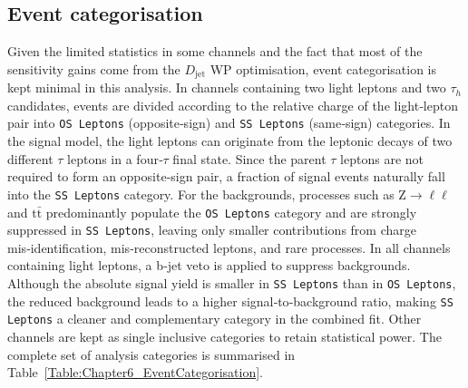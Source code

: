 \subsection{Event categorisation}
Given the limited statistics in some channels and the fact that most of the sensitivity gains come from the $D_\text{jet}$ WP optimisation, event categorisation is kept minimal in this analysis. In channels containing two light leptons and two $\tau_h$ candidates, events are divided according to the relative charge of the light‑lepton pair into \texttt{OS Leptons} (opposite‑sign) and \texttt{SS Leptons} (same‑sign) categories. In the signal model, the light leptons can originate from the leptonic decays of two different $\tau$ leptons in a four‑$\tau$ final state. Since the parent $\tau$ leptons are not required to form an opposite‑sign pair, a fraction of signal events naturally fall into the \texttt{SS Leptons} category. For the backgrounds, processes such as $\mathrm{Z\to\ell\ell}$ and $\mathrm{t\bar{t}}$ predominantly populate the \texttt{OS Leptons} category and are strongly suppressed in \texttt{SS Leptons}, leaving only smaller contributions from charge mis‑identification, mis‑reconstructed leptons, and rare processes. In all channels containing light leptons, a b‑jet veto is applied to suppress backgrounds. Although the absolute signal yield is smaller in \texttt{SS Leptons} than in \texttt{OS Leptons}, the reduced background leads to a higher signal‑to‑background ratio, making \texttt{SS Leptons} a cleaner and complementary category in the combined fit. Other channels are kept as single inclusive categories to retain statistical power. The complete set of analysis categories is summarised in Table~\ref{Table:Chapter6_EventCategorisation}.

